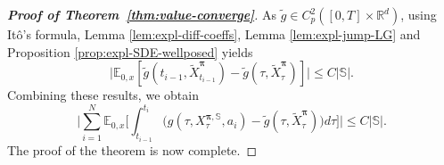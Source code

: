 \documentclass[11pt]{article}
\newcommand{\1}{\mathbbm{1}}
\newcommand{\bpi}{\boldsymbol{\pi}}
\begin{document}
\begin{proof}[\bf Proof of Theorem~\ref{thm:value-converge}]
As $\tilde{g}\in C^{2}_p([0,T]\times\mathbb{R}^d)$, using It\^o's formula, Lemma \ref{lem:expl-diff-coeffs}, Lemma \ref{lem:expl-jump-LG} and Proposition \ref{prop:expl-SDE-wellposed} yields
\begin{equation}
	\big|\mathbb{E}_{0,x}[\tilde{g}(t_{i-1}, \tilde{X}_{t_{i-1}}^{\bpi}) - \tilde{g}(\tau, \tilde{X}_{\tau}^{\bpi})]\big| \leq C|\mathbb{S}|.
\end{equation}
Combining these results, we obtain
\begin{equation}
	\Big|\sum_{i=1}^N \mathbb{E}_{0,x}\Big[\int_{t_{i-1}}^{t_i} \big(g(\tau, X_\tau^{\bpi, \mathbb{S}}, a_i) - \tilde{g}(\tau, \tilde{X}_{\tau}^{\bpi})\big)d\tau\Big]\Big| \leq C|\mathbb{S}|.
\end{equation}
The proof of the theorem is now complete.  \color{black}
\end{proof}
\end{document}
